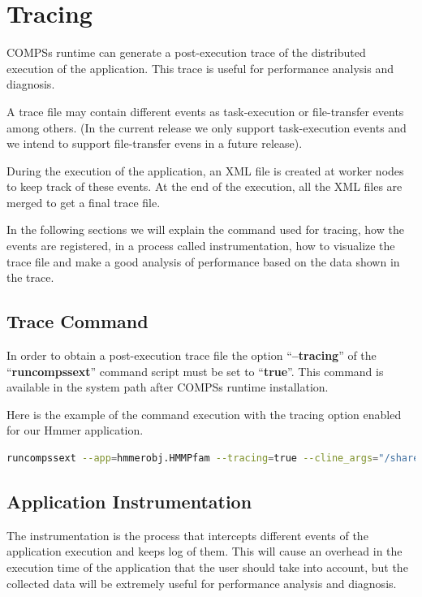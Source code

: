 \section{Tracing}
\label{sec:Tracing}

COMPSs runtime can generate a post-execution trace of the distributed execution of the application. This trace is useful for performance analysis and diagnosis.

A trace file may contain different events as task-execution or file-transfer events among others. (In the current release we only support task-execution events and we intend to support file-transfer evens in a future release).

During the execution of the application, an XML file is created at worker nodes to keep track of these events. At the end of the execution, all the XML files are merged to get a final trace file.

In the following sections we will explain the command used for tracing, how the events are registered, in a process called instrumentation, how to visualize the trace file and make a good analysis of performance based on the data shown in the trace.

\subsection{Trace Command}
In order to obtain a post-execution trace file the option ``{\bf --tracing}'' of the ``{\bf runcompssext}'' command script must be set to ``{\bf true}''. This command is available in the system path after COMPSs runtime installation.

Here is the example of the command execution with the tracing option enabled for our Hmmer application.

\begin{lstlisting}[language=bash]
runcompssext --app=hmmerobj.HMMPfam --tracing=true --cline_args="/sharedDisk/Hmmer/smart.HMMs.bin /sharedDisk/Hmmer/256seq   /home/user/out.txt 2 8 -A 222"
\end{lstlisting}
 

\subsection{Application Instrumentation}

The instrumentation is the process that intercepts different events of the application execution and keeps log of them. This will cause an overhead in the execution time of the application that the user should take into account, but the collected data will be extremely useful for performance analysis and diagnosis.

